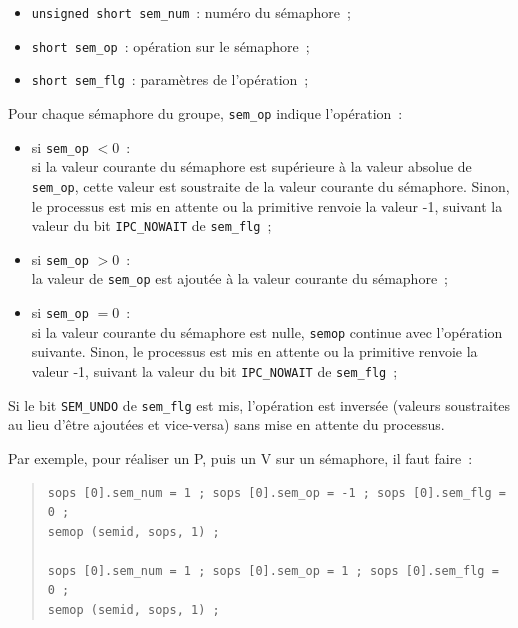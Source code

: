 \documentclass [twoside] {report}
\begin{document}
\begin {itemize}
    \item \texttt {unsigned short sem\_num}~: numéro du sémaphore~;
    \item \texttt {short sem\_op}~: opération sur le sémaphore~;
    \item \texttt {short sem\_flg}~: paramètres de l'opération~;
\end {itemize}

Pour chaque sémaphore du groupe, \texttt {sem\_op} indique l'opération~:

\begin {itemize}
    \item si \texttt {sem\_op} $< 0$~:\\
	si la valeur courante du sémaphore est supérieure à la valeur
	absolue de \texttt {sem\_op}, cette valeur est soustraite de la
	valeur courante du sémaphore. Sinon, le processus est mis en
	attente ou la primitive renvoie la valeur -1, suivant la valeur
	du bit \texttt {IPC\_NOWAIT} de \texttt {sem\_flg}~;

    \item si \texttt {sem\_op} $> 0$~:\\
	la valeur de \texttt {sem\_op} est ajoutée à la valeur courante du
	sémaphore~;

    \item si \texttt {sem\_op} $= 0$~:\\
	si la valeur courante du sémaphore est nulle, \texttt {semop}
	continue avec l'opération suivante. Sinon, le processus est mis
	en attente ou la primitive renvoie la valeur -1, suivant la
	valeur du bit \texttt {IPC\_NOWAIT} de \texttt {sem\_flg}~;
\end {itemize}

Si le bit \texttt {SEM\_UNDO} de \texttt {sem\_flg} est mis, l'opération est
inversée (valeurs soustraites au lieu d'être ajoutées et vice-versa)
sans mise en attente du processus.

Par exemple, pour réaliser un P, puis un V sur un sémaphore, il faut
faire~:

\begin {quote}
\small
\begin {verbatim}
sops [0].sem_num = 1 ; sops [0].sem_op = -1 ; sops [0].sem_flg = 0 ;
semop (semid, sops, 1) ;

sops [0].sem_num = 1 ; sops [0].sem_op = 1 ; sops [0].sem_flg = 0 ;
semop (semid, sops, 1) ;
\end{verbatim}
\end {quote}
\end{document}
